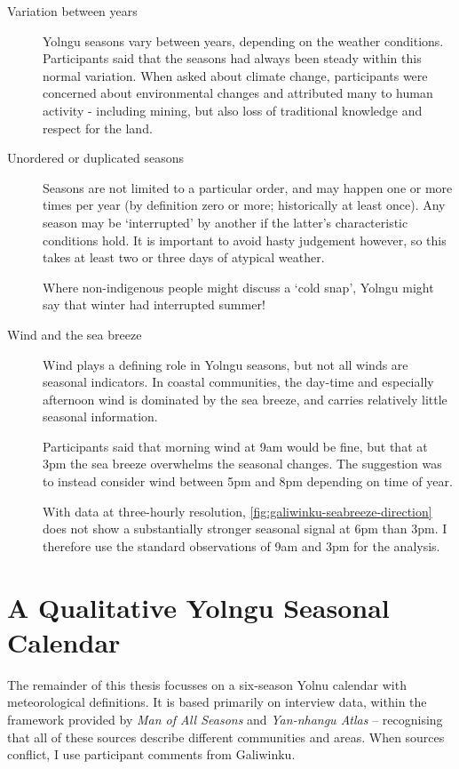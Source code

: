 \begin{description}
\item[Variation between years]
    Yolngu seasons vary between years, depending on the weather conditions.
    Participants said that the seasons had always been steady within this
    normal variation.  When asked about climate change, participants were
    concerned about environmental changes and attributed many to human
    activity - including mining, but also loss of traditional knowledge
    and respect for the land.

\item[Unordered or duplicated seasons]
    Seasons are not limited to a particular order, and may happen one or more
    times per year (by definition zero or more; historically at least once).
    Any season may be `interrupted' by another if the latter's characteristic
    conditions hold.  It is important to avoid hasty judgement however, so this
    takes at least two or three days of atypical weather.

    Where non-indigenous people might discuss a `cold snap', Yolngu might
    say that winter had interrupted summer!

\item[Wind and the sea breeze]
    Wind plays a defining role in Yolngu seasons, but not all winds are
    seasonal indicators.  In coastal communities, the day-time and especially
    afternoon wind is dominated by the sea breeze, and carries relatively little
    seasonal information.

    Participants said that morning wind at 9am would be fine, but that at
    3pm the sea breeze overwhelms the seasonal changes.  The suggestion was
    to instead consider wind between 5pm and 8pm depending on time of year.

    With data at three-hourly resolution, \cref{fig:galiwinku-seabreeze-direction}
    does not show a substantially stronger seasonal signal at 6pm than 3pm.
    I therefore use the standard observations of 9am and 3pm for the analysis.

\end{description}



\section{A Qualitative Yolngu Seasonal Calendar}
\label{sec:calendar-description}

The remainder of this thesis focusses on a six-season Yolnu calendar with
meteorological definitions.  It is based primarily on interview data, within
the framework provided by \textit{Man of All Seasons} \citep{davis1989} and
\textit{Yan-nhangu Atlas} \citep{atlas2014} -- recognising that all of these
sources describe different communities and areas.  When sources conflict, I
use participant comments from Galiwinku.

